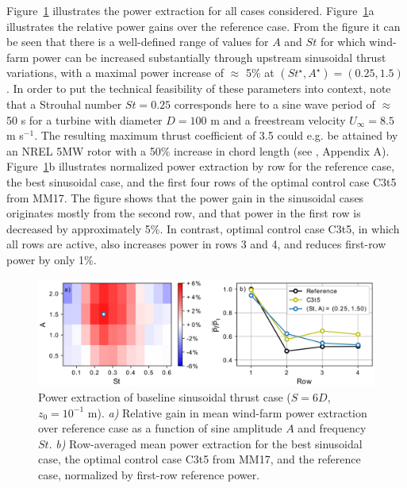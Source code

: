 \documentclass[wes, manuscript]{copernicus}
\begin{document}
Figure~\ref{fig:sinus_baseline} illustrates the power extraction for all cases considered. Figure~\ref{fig:sinus_baseline}a illustrates the relative power gains over the reference case. From the figure it can be seen that there is a well-defined range of values for $A$ and $St$ for which wind-farm power can be increased substantially through upstream sinusoidal thrust variations, with a maximal power increase of $\approx$ 5\% at $(St^\star, A^\star) = (0.25, 1.5)$. In order to put the technical feasibility of these parameters into context, note that a Strouhal number $St = 0.25$ corresponds here to a sine wave period of $\approx$ 50 s for a turbine with diameter $D = 100$ m and a freestream velocity $U_\infty = 8.5$ m s$^{-1}$. The resulting maximum thrust coefficient of 3.5 could e.g. be attained by an NREL 5MW rotor with a 50\% increase in chord length (see \citealp{goit2015optimal}, Appendix A). Figure~\ref{fig:sinus_baseline}b illustrates normalized power extraction by row for the reference case, the best sinusoidal case, and the first four rows of the optimal control case C3t5 from MM17. The figure shows that the power gain in the sinusoidal cases originates mostly from the second row, and that power in the first row is decreased by approximately 5\%. In contrast, optimal control case C3t5, in which all rows are active, also increases power in rows 3 and 4, and reduces first-row power by only 1\%. 
\begin{figure}
	\centering
	\includegraphics[width=\textwidth]{gains_turbulent_6D_6D_6D_wide_inphase2.eps}
	\caption{Power extraction of baseline sinusoidal thrust case ($S = 6D$, $z_0 = 10^{-1}$ m). \emph{a) } Relative gain in mean wind-farm power extraction over reference case as a function of sine amplitude $A$ and frequency $St$. \emph{b) } Row-averaged mean power extraction for the best sinusoidal case, the optimal control case C3t5 from MM17, and the reference case, normalized by first-row reference power.\label{fig:sinus_baseline} }
\end{figure}
\end{document}
